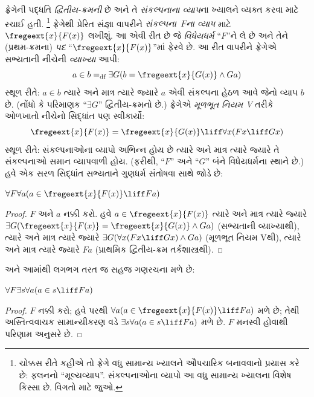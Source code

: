 ફ્રેગેની પદ્ધતિ \emph{દ્વિતીય-ક્રમની} છે અને તે
\emph{સંકલ્પનાના વ્યાપ}ના ખ્યાલને વ્યક્ત કરવા માટે રચાઈ હતી.
\footnote{ચોક્કસ રીતે કહીએ તો ફ્રેગે વધુ સામાન્ય ખ્યાલને
ઔપચારિક બનાવવાનો પ્રયાસ કરે છે: ફલનનો ``મૂલ્યવ્યાપ''.
સંકલ્પનાઓના વ્યાપો આ વધુ સામાન્ય ખ્યાલના વિશેષ કિસ્સા છે.
વિગતો માટે \citet[pp.\ 8--9]{Heck2012} જુઓ.}
ફ્રેગેથી પ્રેરિત સંજ્ઞા વાપરીને
\emph{સંકલ્પના~$F$ના વ્યાપ} માટે $\fregeext{x}{F(x)}$ લખીશું.
આ એવી રીત છે જે \emph{વિધેયધર્મ} ``$F$''ને લે છે અને તેને
(પ્રથમ-ક્રમના) \emph{પદ} ``$\fregeext{x}{F(x)}$''માં ફેરવે છે.
આ રીત વાપરીને ફ્રેગેએ સભ્યતાની નીચેની \emph{વ્યાખ્યા} આપી:
\[
a \in b =_\text{df} \exists G(b = \fregeext{x}{G(x)} \land Ga)
\]
સ્થૂળ રીતે: $a \in b$ ત્યારે અને માત્ર ત્યારે જ્યારે $a$ એવી
સંકલ્પના હેઠળ આવે જેનો વ્યાપ $b$ છે. (નોંધો કે પરિમાણક
``$\exists G$'' દ્વિતીય-ક્રમનો છે.) ફ્રેગેએ
\emph{મૂળભૂત નિયમ V} તરીકે ઓળખાતો નીચેનો સિદ્ધાંત પણ સ્વીકાર્યો:
$$\fregeext{x}{F(x)} = \fregeext{x}{G(x)} \liff \forall x (Fx \liff Gx)$$
સ્થૂળ રીતે: સંકલ્પનાઓના વ્યાપો અભિન્ન હોય છે ત્યારે અને માત્ર
ત્યારે જ્યારે તે સંકલ્પનાઓ સમાન વ્યાપવાળી હોય. (ફરીથી, ``$F$''
અને ``$G$'' બંને વિધેયધર્મના સ્થાને છે.) હવે એક સરળ સિદ્ધાંત
સભ્યતાને ગુણધર્મ સંતોષવા સાથે જોડે છે:

\begin{lem}
$\forall F \forall a(a \in \fregeext{x}{F(x)} \liff Fa)$
\end{lem}

\begin{proof}
$F$ અને $a$ નક્કી કરો. હવે $a \in \fregeext{x}{F(x)}$ ત્યારે અને
માત્ર ત્યારે જ્યારે $\exists G(\fregeext{x}{F(x)}
= \fregeext{x}{G(x)} \land Ga)$ (સભ્યતાની વ્યાખ્યાથી), ત્યારે અને
માત્ર ત્યારે જ્યારે $\exists G(\forall x(Fx \liff Gx) \land Ga)$
(મૂળભૂત નિયમ Vથી), ત્યારે અને માત્ર ત્યારે જ્યારે $Fa$
(પ્રાથમિક દ્વિતીય-ક્રમ તર્કશાસ્ત્રથી).
\end{proof}

અને આમાંથી લગભગ તરત જ સહજ ગણરચના મળે છે:

\begin{lem}
$\forall F \exists s \forall a (a \in s \liff Fa)$
\end{lem}

\begin{proof}
$F$ નક્કી કરો; હવે  પરથી
$\forall a (a \in
\fregeext{x}{F(x)} \liff Fa)$ મળે છે; તેથી અસ્તિત્વવાચક
સામાન્યીકરણ વડે $\exists s\forall a(a \in s \liff Fa)$ મળે છે.
$F$ મનસ્વી હોવાથી પરિણામ અનુસરે છે.
\end{proof}


